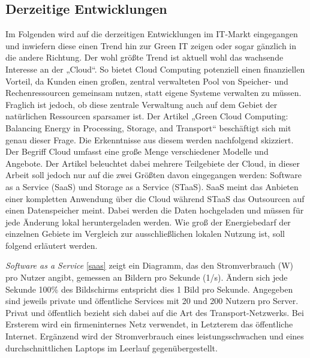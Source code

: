 \documentclass[utf8,biblatex]{lni}
\begin{document}
\subsection{Derzeitige Entwicklungen}
\label{Aktuell}
Im Folgenden wird auf die derzeitigen Entwicklungen im IT-Markt eingegangen und inwiefern diese einen Trend hin zur Green IT zeigen oder sogar gänzlich in die andere Richtung. Der wohl größte Trend ist aktuell wohl das wachsende Interesse an der „Cloud“. So bietet Cloud Computing potenziell einen finanziellen Vorteil, da Kunden einen großen, zentral verwalteten Pool von Speicher- und Rechenressourcen gemeinsam nutzen, statt eigene Systeme verwalten zu müssen. \cite{Kondo09} Fraglich ist jedoch, ob diese zentrale Verwaltung auch auf dem Gebiet der natürlichen Ressourcen sparsamer ist. Der Artikel „Green Cloud Computing: Balancing Energy in Processing, Storage, and Transport“ beschäftigt sich mit genau dieser Frage. Die Erkenntnisse aus diesem werden nachfolgend skizziert. Der Begriff Cloud umfasst eine große Menge verschiedener Modelle und Angebote. Der Artikel beleuchtet dabei mehrere Teilgebiete der Cloud, in dieser Arbeit soll jedoch nur auf die zwei Größten davon eingegangen werden: Software as a Service (SaaS) und Storage as a Service (STaaS). SaaS meint das Anbieten einer kompletten Anwendung über die Cloud während STaaS das Outsourcen auf einen Datenspeicher meint. Dabei werden die Daten hochgeladen und müssen für jede Änderung lokal heruntergeladen werden. \cite{Wikipedia22} Wie groß der Energiebedarf der einzelnen Gebiete im Vergleich zur ausschließlichen lokalen Nutzung ist, soll folgend erläutert werden.

\textit{Software as a Service} \newline
\autoref{saas} zeigt ein Diagramm, das den Stromverbrauch (W) pro Nutzer angibt, gemessen an Bildern pro Sekunde (1/s). Ändern sich jede Sekunde 100\% des Bildschirms entspricht dies 1 Bild pro Sekunde. Angegeben sind jeweils private und öffentliche Services mit 20 und 200 Nutzern pro Server. Privat und öffentlich bezieht sich dabei auf die Art des Transport-Netzwerks. Bei Ersterem wird ein firmeninternes Netz verwendet, in Letzterem das öffentliche Internet. Ergänzend wird der Stromverbrauch eines leistungsschwachen und eines durchschnittlichen Laptops im Leerlauf gegenübergestellt.
\end{document}
